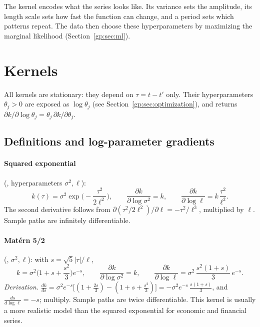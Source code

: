 The kernel encodes what the series looks like. Its variance sets the amplitude,
its length scale sets how fast the function can change, and a period sets which
patterns repeat. The data then choose these hyperparameters by maximizing the
marginal likelihood (Section~\ref{gp:sec:ml}).

\section{Kernels}

All  kernels are stationary: they depend on $\tau=t-t'$ only.
Their hyperparameters $\theta_j>0$ are exposed as $\log\theta_j$ (see
Section~\ref{gp:sec:optimization}), and  returns
$\partial k/\partial\log\theta_j=\theta_j\,\partial k/\partial\theta_j$.

\subsection{Definitions and log-parameter gradients}

\paragraph{Squared exponential} (, hyperparameters $\sigma^2,\ell$):
\[
  k(\tau)=\sigma^2\exp\!\Big(-\frac{\tau^2}{2\ell^2}\Big),\qquad
  \frac{\partial k}{\partial\log\sigma^2}=k,\qquad
  \frac{\partial k}{\partial\log\ell}=k\,\frac{\tau^2}{\ell^2}.
\]
The second derivative follows from $\partial(\tau^2/2\ell^2)/\partial\ell=-\tau^2/\ell^3$,
multiplied by $\ell$. Sample paths are infinitely differentiable.

\paragraph{Matérn 5/2} (, $\sigma^2,\ell$): with $s=\sqrt5|\tau|/\ell$,
\[
  k=\sigma^2\Big(1+s+\frac{s^2}{3}\Big)e^{-s},\qquad
  \frac{\partial k}{\partial\log\sigma^2}=k,\qquad
  \frac{\partial k}{\partial\log\ell}=\sigma^2\,\frac{s^2(1+s)}{3}\,e^{-s}.
\]
\emph{Derivation.} $\frac{dk}{ds}=\sigma^2e^{-s}\big[(1+\tfrac{2s}{3})-(1+s+\tfrac{s^2}{3})\big]
=-\sigma^2e^{-s}\,\tfrac{s(1+s)}{3}$, and $\frac{ds}{d\log\ell}=-s$; multiply.
Sample paths are twice differentiable. This kernel is usually a more realistic model than the squared exponential
for economic and financial series.

